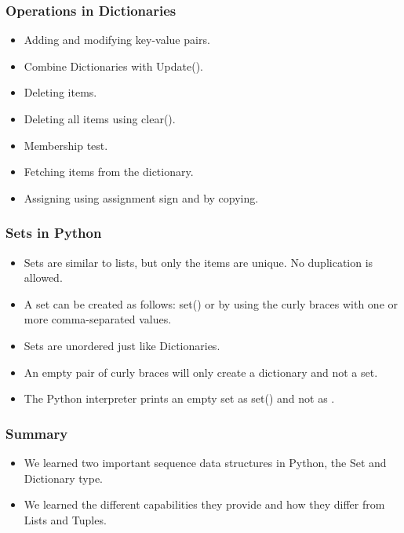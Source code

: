 \documentclass{beamer}
\begin{document}
\begin{frame}
\frametitle{Operations in Dictionaries}
\begin{itemize}
\item Adding and modifying key-value pairs.
\item Combine Dictionaries with Update().
\item Deleting items.
\item Deleting all items using clear().
\item Membership test.
\item Fetching items from the dictionary.
\item Assigning using assignment sign and by copying.
\end{itemize}
\end{frame}

\begin{frame}[fragile]
\frametitle{Sets in Python}
\begin{itemize}
\item Sets are similar to lists, but only the items are unique. No duplication is allowed.
\item A set can be created as follows: set() or by using the curly braces with one or more comma-separated values.
\item Sets are unordered just like Dictionaries.
\item An empty pair of curly braces will only create a dictionary and not a set.
\item The Python interpreter prints an empty set as set() and not as {}.
\end{itemize}
\end{frame}

\begin{frame}
\frametitle{Summary}
\begin{itemize}
\item We learned two important sequence data structures in Python, the Set and Dictionary type.
\item We learned the different capabilities they provide and how they differ from Lists and Tuples.
\end{itemize}
\end{frame}
\end{document}
